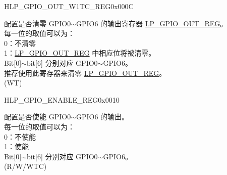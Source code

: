 \begin{register}{H}{LP\_GPIO\_OUT\_W1TC\_REG}{0x000C}\label{regdesc:LPGPIOOUTW1TCREG}
%
%
\regnewline%
\begin{regdesc}\begin{reglist}
\label{fielddesc:LPGPIOOUTW1TC}\item [LP\_GPIO\_OUT\_W1TC] 配置是否清零 GPIO0$\sim$GPIO6 的输出寄存器 \hyperref[regdesc:LPGPIOOUTREG]{LP\_GPIO\_OUT\_REG}。\\
每一位的取值可以为：\\
0：不清零\\
1：\hyperref[regdesc:LPGPIOOUTREG]{LP\_GPIO\_OUT\_REG} 中相应位将被清零。\\
Bit[0]$\sim$bit[6] 分别对应 GPIO0$\sim$GPIO6。\\
推荐使用此寄存器来清零 \hyperref[regdesc:LPGPIOOUTREG]{LP\_GPIO\_OUT\_REG}。\\
(WT)
\end{reglist}\end{regdesc}
\end{register}


\begin{register}{H}{LP\_GPIO\_ENABLE\_REG}{0x0010}\label{regdesc:LPGPIOENABLEREG}
%
%
\regnewline%
\begin{regdesc}\begin{reglist}
\label{fielddesc:LPGPIOENABLEDATA}\item [LP\_GPIO\_ENABLE\_DATA] 配置是否使能 GPIO0$\sim$GPIO6 的输出。\\
每一位的取值可以为：\\
0：不使能\\
1：使能\\
Bit[0]$\sim$bit[6] 分别对应 GPIO0$\sim$GPIO6。\\
 (R/W/WTC)
\end{reglist}\end{regdesc}
\end{register}


